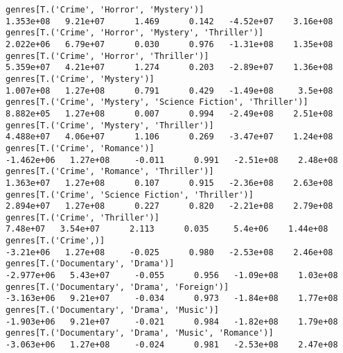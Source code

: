 \documentclass[11pt]{article}
\begin{document}
\begin{Verbatim}[commandchars=\\\{\}]
genres[T.('Crime', 'Horror', 'Mystery')]                                                                      1.353e+08   9.21e+07      1.469      0.142   -4.52e+07    3.16e+08
genres[T.('Crime', 'Horror', 'Mystery', 'Thriller')]                                                          2.022e+06   6.79e+07      0.030      0.976   -1.31e+08    1.35e+08
genres[T.('Crime', 'Horror', 'Thriller')]                                                                     5.359e+07   4.21e+07      1.274      0.203   -2.89e+07    1.36e+08
genres[T.('Crime', 'Mystery')]                                                                                1.007e+08   1.27e+08      0.791      0.429   -1.49e+08     3.5e+08
genres[T.('Crime', 'Mystery', 'Science Fiction', 'Thriller')]                                                 8.882e+05   1.27e+08      0.007      0.994   -2.49e+08    2.51e+08
genres[T.('Crime', 'Mystery', 'Thriller')]                                                                    4.488e+07   4.06e+07      1.106      0.269   -3.47e+07    1.24e+08
genres[T.('Crime', 'Romance')]                                                                               -1.462e+06   1.27e+08     -0.011      0.991   -2.51e+08    2.48e+08
genres[T.('Crime', 'Romance', 'Thriller')]                                                                    1.363e+07   1.27e+08      0.107      0.915   -2.36e+08    2.63e+08
genres[T.('Crime', 'Science Fiction', 'Thriller')]                                                            2.894e+07   1.27e+08      0.227      0.820   -2.21e+08    2.79e+08
genres[T.('Crime', 'Thriller')]                                                                                7.48e+07   3.54e+07      2.113      0.035     5.4e+06    1.44e+08
genres[T.('Crime',)]                                                                                          -3.21e+06   1.27e+08     -0.025      0.980   -2.53e+08    2.46e+08
genres[T.('Documentary', 'Drama')]                                                                           -2.977e+06   5.43e+07     -0.055      0.956   -1.09e+08    1.03e+08
genres[T.('Documentary', 'Drama', 'Foreign')]                                                                -3.163e+06   9.21e+07     -0.034      0.973   -1.84e+08    1.77e+08
genres[T.('Documentary', 'Drama', 'Music')]                                                                  -1.903e+06   9.21e+07     -0.021      0.984   -1.82e+08    1.79e+08
genres[T.('Documentary', 'Drama', 'Music', 'Romance')]                                                       -3.063e+06   1.27e+08     -0.024      0.981   -2.53e+08    2.47e+08

\end{Verbatim}
\end{document}
